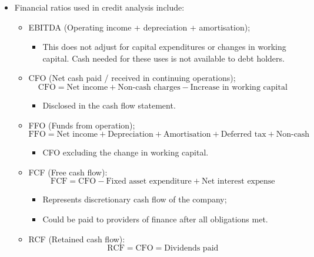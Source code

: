 \documentclass[../notes_compiled.tex]{subfiles}
\begin{document}
\begin{itemize}
\item Financial ratios used in credit analysis include:
\begin{itemize}
\item EBITDA (Operating income + depreciation + amortisation);
\begin{itemize}
\item This does not adjust for capital expenditures or changes in working capital. Cash needed for these uses is not available to debt holders.
\end{itemize}
\item CFO (Net cash paid / received in continuing operations);
\begin{equation*}
\text{CFO} = \text{Net income} + \text{Non-cash charges} - \text{Increase in working capital}
\end{equation*}
\begin{itemize}
\item Disclosed in the cash flow statement.
\end{itemize}
\item FFO (Funds from operation);
\begin{equation*}
\text{FFO} = \text{Net income} + \text{Depreciation} + \text{Amortisation} + \text{Deferred tax} + \text{Non-cash}
\end{equation*}
\begin{itemize}
\item CFO excluding the change in working capital.
\end{itemize}
\item FCF (Free cash flow):
\begin{equation*}
\text{FCF} = \text{CFO} - \text{Fixed asset expenditure} + \text{Net interest expense}
\end{equation*}
\begin{itemize}
\item Represents discretionary cash flow of the company;
\item Could be paid to providers of finance after all obligations met.
\end{itemize}
\item RCF (Retained cash flow):
\begin{equation*}
\text{RCF} = \text{CFO} = \text{Dividends paid}
\end{equation*}
\end{itemize}


\end{itemize}
\end{document}
